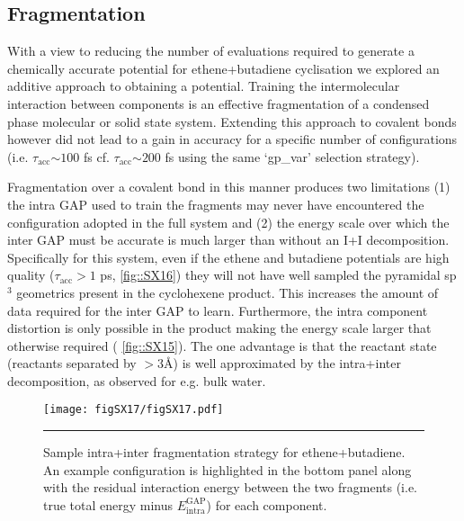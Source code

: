 \documentclass[11pt]{article}
\numberwithin{equation}{subsection}
\newcommand{\tacc}{$\tau_\text{acc}$}
\newcommand{\comment}[1]{}
\begin{document}
\clearpage
\subsection{Fragmentation}

\comment{
	TJW: The graph goes to 100, but you stop at 60. Are you going to add more t_acc for n_eval > 60?
	TY: Nope
	
	TJW: Is it worth having a graphical comparison between the t_accs for doing the I+I decomposition vs not doing it?
	TY: I hate bar charts, what do other people think?
}

With a view to reducing the number of evaluations required to generate a chemically accurate potential for ethene+butadiene cyclisation we explored an additive approach to obtaining a potential. Training the intermolecular interaction between components is an effective fragmentation of a condensed phase molecular\cite{gaptrain2021} or solid state system.\cite{Wengert2021} Extending this approach to covalent bonds however did not lead to a  gain in accuracy for a specific number of configurations (i.e. \tacc $\sim 100$ fs cf. \tacc $\sim 200$ fs using the same `gp\_var' selection strategy).

Fragmentation over a covalent bond in this manner produces two limitations (1) the intra GAP used to train the fragments may never have encountered the configuration adopted in the full system and (2) the energy scale over which the inter GAP must be accurate is much larger than without an I+I decomposition. Specifically for this system, even if the ethene and butadiene potentials are high quality ($\tau_\text{acc} > 1$ ps, \figurename{ \ref{fig::SX16}}) they will not have well sampled the pyramidal sp${}^3$ geometrics present in the  cyclohexene product. This increases the amount of data required for the inter GAP to learn. Furthermore, the intra component distortion is only possible in the product making the energy scale larger that otherwise required (\figurename{ \ref{fig::SX15}}). The one advantage is that the reactant state (reactants separated by $> 3$\AA) is well approximated by the intra+inter decomposition, as observed for e.g. bulk water.


\begin{figure}[h!]
	\centering
	\vspace{0.4cm}
	\texttt{[image: figSX17/figSX17.pdf]}
	\vspace{0.1cm}
	\hrule
	\vspace{0.1cm}
	\caption{Sample intra+inter fragmentation strategy for ethene+butadiene. An example configuration is highlighted in the bottom panel along with the residual interaction energy between the two fragments (i.e. true total energy minus $E_\text{intra}^\text{GAP}$) for each component.}
	\label{fig::SX17}
\end{figure}
\end{document}
